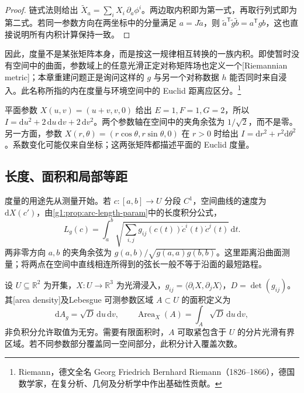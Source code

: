 \begin{proof}
	链式法则给出 \(\widetilde X_a=\sum_iX_i\,\partial_a\phi^i\)。两边取内积即为第一式，再取行列式即为第二式。若同一参数方向在两坐标中的分量满足 \(a=J\widetilde a\)，则 \(\widetilde a^{\mathsf T}\widetilde g\widetilde b=a^{\mathsf T}gb\)，这也直接说明所有内积计算保持一致。
\end{proof}

因此，度量不是某张矩阵本身，而是按这一规律相互转换的一族内积。即使暂时没有空间中的曲面，参数域上的任意光滑正定对称矩阵场也定义一个[Riemannian metric]；本章重建问题正是询问这样的 \(g\) 与另一个对称数据 \(h\) 能否同时来自浸入。此名称所指的内在度量与环境空间中的 Euclid 距离应区分。\footnote{Riemann，德文全名 Georg Friedrich Bernhard Riemann（1826--1866），德国数学家，在复分析、几何及分析学中作出基础性贡献。}

\begin{example}\label{g1:exm:oblique-plane-metric}
	平面参数 \(X(u,v)=(u+v,v,0)\) 给出 \(E=1,F=1,G=2\)，所以 \(I=\mathrm{d}u^2+2\,\mathrm{d}u\,\mathrm{d}v+2\,\mathrm{d}v^2\)。两个参数轴在空间中的夹角余弦为 \(1/\sqrt2\)，而不是零。另一方面，参数 \(X(r,\theta)=(r\cos\theta,r\sin\theta,0)\) 在 \(r>0\) 时给出 \(I=\mathrm{d}r^2+r^2\mathrm{d}\theta^2\)。系数变化可能仅来自坐标；这两张矩阵都描述平面的 Euclid 度量。
\end{example}

\subsection{长度、面积和局部等距}
\label{g1:subsec:0801:03}

度量的用途先从测量开始。若 \(c:[a,b]\rightarrow U\) 分段 \(C^1\)，空间曲线的速度为 \(\mathrm{d}X(c')\)，由\cref{g1:prop:arc-length-param}中的长度积分公式，
\begin{equation}\label{g1:eq:surface-length}
	L_g(c)=\int_a^b\sqrt{\sum_{i,j}g_{ij}(c(t))\dot c^i(t)\dot c^j(t)}\,\mathrm{d}t.
\end{equation}
两非零方向 \(a,b\) 的夹角余弦为 \(g(a,b)/\sqrt{g(a,a)g(b,b)}\)。这里距离沿曲面测量；将两点在空间中直线相连所得到的弦长一般不等于沿面的最短路程。

\begin{definition}\label{g1:def:surface-area-density}
	设 \(U\subseteq\mathbb R^2\) 为开集，\(X:U\rightarrow\mathbb R^3\) 为光滑浸入，\(g_{ij}=\langle\partial_iX,\partial_jX\rangle\)，\(D=\det(g_{ij})\)。其[area density]及Lebesgue 可测参数区域 \(A\subset U\) 的面积定义为
	\[
		\mathrm{d}A_g=\sqrt D\,\mathrm{d}u\,\mathrm{d}v,\qquad
		\operatorname{Area}_X(A)=\int_A\sqrt D\,\mathrm{d}u\,\mathrm{d}v,
	\]
	非负积分允许取值为无穷。需要有限面积时，\(A\) 可取紧包含于 \(U\) 的分片光滑有界区域。若不同参数部分覆盖同一空间部分，此积分计入覆盖次数。
\end{definition}

